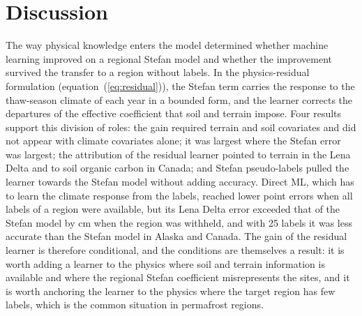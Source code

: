\section{Discussion}\label{sec:discussion}

The way physical knowledge enters the model determined whether machine learning improved on a regional Stefan model and whether the improvement survived the transfer to a region without labels. In the physics-residual formulation (equation~(\ref{eq:residual})), the Stefan term carries the response to the thaw-season climate of each year in a bounded form, and the learner corrects the departures of the effective coefficient that soil and terrain impose. Four results support this division of roles: the gain required terrain and soil covariates and did not appear with climate covariates alone; it was largest where the Stefan error was largest; the attribution of the residual learner pointed to terrain in the Lena Delta and to soil organic carbon in Canada; and Stefan pseudo-labels pulled the learner towards the Stefan model without adding accuracy. Direct ML, which has to learn the climate response from the labels, reached lower point errors when all labels of a region were available, but its Lena Delta error exceeded that of the Stefan model by \ndrefLeregDzabs{} cm when the region was withheld, and with 25 labels it was less accurate than the Stefan model in Alaska and Canada. The gain of the residual learner is therefore conditional, and the conditions are themselves a result: it is worth adding a learner to the physics where soil and terrain information is available and where the regional Stefan coefficient misrepresents the sites, and it is worth anchoring the learner to the physics where the target region has few labels, which is the common situation in permafrost regions.

